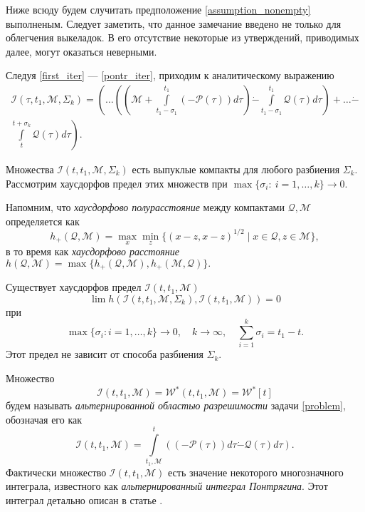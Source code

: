 Ниже всюду будем случитать предположение \eqref{assumption_nonempty} выполненым. Следует заметить,
 что данное замечание введено не только для облегчения выкеладок. В его отсутствие некоторые из
 утверждений, приводимых далее, могут оказаться неверными.

Следуя \eqref{first_iter} --- \eqref{pontr_iter}, приходим к аналитическому выражению
\begin{multline}\label{pontr_analytical}
    \mathcal{I}(\tau, t_1, \mathcal{M}, \Sigma_k) = \left( \dots \left( \left( \mathcal{M} + 
     \int\limits_{t_1 - \sigma_1}^{t_1} (-\mathcal{P}(\tau)) d\tau \right) \dot{-} \int\limits_
     {t_1 - \sigma_1}^{t_1} \mathcal{Q}(\tau) d\tau \right) + \dots \dot{-} \right. \\
    \left. \int\limits_t^{t + \sigma_k} \mathcal{Q}(\tau) d\tau \right).
\end{multline}

Множества \( \mathcal{I} (t, t_1, \mathcal{M}, \Sigma_k) \) есть выпуклые компакты для любого
 разбиения \( \Sigma_k \). Рассмотрим хаусдорфов предел этих множеств при \( \max \{\sigma_i : 
 \ i = 1, \dots, k \} \to 0 \).

 Напомним, что \emph{хаусдорфово полурасстояние} между компактами \( \mathcal{Q}, \mathcal{M} \)
 определяется как 
\[ 
    h_+(\mathcal{Q}, \mathcal{M}) = \max_x \min_z \{(x - z, x - z)^{1/2} \mid x \in \mathcal{Q}, 
     z \in \mathcal{M} \},
\]
в то время как \emph{хаусдорфово расстояние} \( h(\mathcal{Q}, \mathcal{M}) = \max
 \{ h_+(\mathcal{Q}, \mathcal{M}), h_+(\mathcal{M}, \mathcal{Q}) \}. \)

\begin{lemma}
    Существует хаусдорфов предел \( \mathcal{I}(t, t_1, \mathcal{M}) \)
    \[
        \lim h \left( \mathcal{I}(t, t_1, \mathcal{M}, \Sigma_k), \mathcal{I}(t, t_1, \mathcal{M})
         \right) = 0
    \]
    при 
    \[
        \max\{\sigma_i: i = 1,\dots, k \} \to 0, \quad k \to \infty, \quad \sum_{i = 1}^k \sigma_i 
         = t_1 - t. 
    \]
    Этот предел не зависит от способа разбиения \( \Sigma_k \).
\end{lemma}
Множество
\begin{equation}\label{alt_sovability_region}
    \mathcal{I}(t, t_1, \mathcal{M}) = \mathcal{W}^*(t,t_1,\mathcal{M}) = \mathcal{W}^*[t]
\end{equation}
будем называть \emph{альтернированной областью разрешимости} задачи \eqref{problem}, обозначая его 
 как 
\[
    \mathcal{I}(t, t_1, \mathcal{M}) = \int\limits_{t_1, \mathcal{M}}^t \left( (-\mathcal{P}(\tau))
     d\tau \dot{-} \mathcal{Q}(\tau) d\tau \right).
\]
Фактически множество \( \mathcal{I}(t, t_1, \mathcal{M}) \) есть значение некоторого многозначного
 интеграла, известного как \emph{альтернированный интеграл Понтрягина}. Этот интеграл детально
 описан в статье \cite{lin_dif_chasing}.

